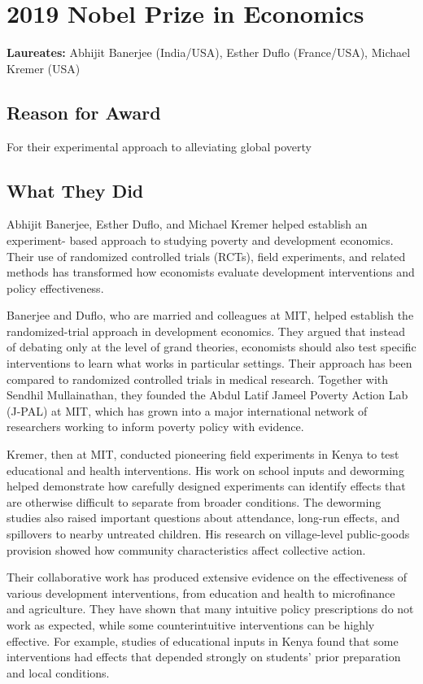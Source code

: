 \chapter{2019 Nobel Prize in Economics}
\textbf{Laureates: }Abhijit Banerjee (India/USA), Esther Duflo (France/USA), Michael Kremer (USA)

\section*{Reason for Award}
For their experimental approach to alleviating global poverty

\section{What They Did}
Abhijit Banerjee, Esther Duflo, and Michael Kremer helped establish an experiment-
based approach to studying poverty and development economics. Their use of
randomized controlled trials (RCTs), field experiments, and related methods has
transformed how economists evaluate development interventions and policy
effectiveness.

Banerjee and Duflo, who are married and colleagues at MIT, helped establish the
randomized-trial approach in development economics. They argued that instead of
debating only at the level of grand theories, economists should also test specific
interventions to learn what works in particular settings. Their approach has been
compared to randomized controlled trials in medical research. Together with
Sendhil Mullainathan, they founded the Abdul Latif Jameel Poverty Action Lab
(J-PAL) at MIT, which has grown into a major international network of researchers
working to inform poverty policy with evidence.

Kremer, then at MIT, conducted pioneering field experiments in Kenya to test
educational and health interventions. His work on school inputs and deworming
helped demonstrate how carefully designed experiments can identify effects that
are otherwise difficult to separate from broader conditions. The deworming studies
also raised important questions about attendance, long-run effects, and spillovers
to nearby untreated children. His research on village-level public-goods provision
showed how community characteristics affect collective action.

Their collaborative work has produced extensive evidence on the effectiveness of various
development interventions, from education and health to microfinance and agriculture. They have
shown that many intuitive policy prescriptions do not work as expected, while some
counterintuitive interventions can be highly effective. For example, studies of
educational inputs in Kenya found that some interventions had effects that depended
strongly on students' prior preparation and local conditions.

